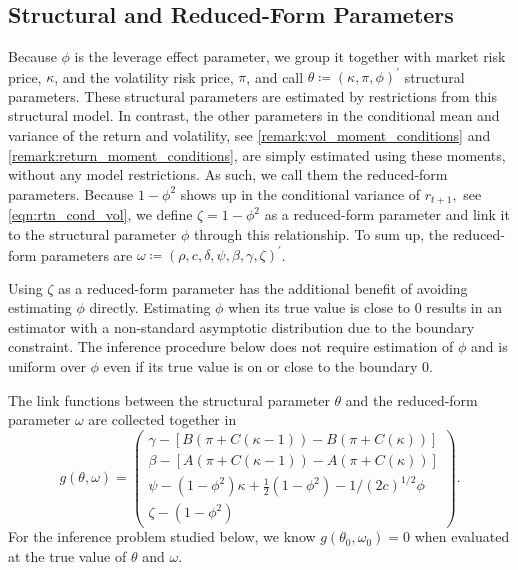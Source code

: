 \documentclass[11pt, letterpaper, twoside]{article}
\begin{document}
\subsection{Structural and Reduced-Form Parameters}

Because $\phi$ is the leverage effect parameter, we group it together with market risk price, $\kappa$, and the volatility risk price, $\pi$, and call $ \theta \coloneqq (\kappa ,\pi ,\phi )^{\prime}$ structural parameters. These structural parameters are estimated by restrictions from this structural model. In contrast, the other parameters in the conditional mean and variance of the return and volatility, see \cref{remark:vol_moment_conditions} and \cref{remark:return_moment_conditions}, are simply estimated using these moments, without any model restrictions. As such, we call them the reduced-form parameters. Because $1-\phi ^{2}$ shows up in the conditional variance of $r_{t+1},$ see \cref{eqn:rtn_cond_vol}, we define $\zeta =1-\phi ^{2}$ as a reduced-form parameter and link it to the structural parameter $\phi$ through this relationship. To sum up, the reduced-form parameters are $\omega \coloneqq (\rho, c,\delta, \psi, \beta, \gamma, \zeta )^{\prime }$.

Using $\zeta $ as a reduced-form parameter has the additional benefit of avoiding estimating $\phi$ directly. Estimating $\phi $ when its true value is close to 0 results in an estimator with a non-standard asymptotic distribution due to the boundary constraint. The inference procedure below does not require estimation of $\phi$ and is uniform over $\phi$ even if its true value is on or close to the boundary $0$.

The link functions between the structural parameter $\theta $ and the reduced-form parameter $\omega $ are collected together in
%
\begin{equation}
   g(\theta, \omega) = 
%
    \begin{pmatrix}
        \gamma - [B\left( \pi +C\left( \kappa -1\right) \right) -B\left( \pi +C\left( \kappa \right) \right)] \\ 
        \beta - [A\left( \pi +C\left( \kappa -1\right) \right) -A\left( \pi +C\left( \kappa \right) \right)] \\ 
        \psi -(1-\phi ^{2})\kappa +\frac{1}{2}(1-\phi ^{2})-1/(2c)^{1/2}\phi  \\ \zeta -\left( 1-\phi ^{2}\right) 
    \end{pmatrix}.
\end{equation}%
%
For the inference problem studied below, we know $g(\theta _{0},\omega_{0})=0$ when evaluated at the true value of $\theta $ and $\omega .$
\end{document}
